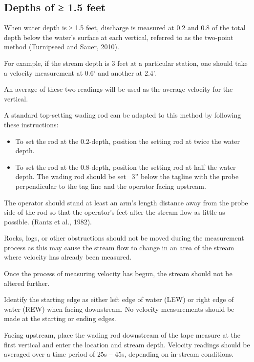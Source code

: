\documentclass[12pt]{../SOP3_beta}\usepackage[]{graphicx}\usepackage[]{xcolor}
\begin{document}
\subsection{Depths of ≥ 1.5 feet}

When water depth is ≥ 1.5 feet, discharge is measured at 0.2 and 0.8 of the total depth
below the water’s surface at each vertical, referred to as the two-point method
(Turnipseed and Sauer, 2010). 

\NP For example, if the stream depth is 3 feet at a particular
station, one should take a velocity measurement at 0.6’ and another at 2.4’. 

\NP An average
of these two readings will be used as the average velocity for the vertical.

\NP A standard top-setting wading rod can be adapted to this method by following these
instructions:

\begin{itemize}

\item To set the rod at the 0.2-depth, position the setting rod at twice the water
depth.

\item To set the rod at the 0.8-depth, position the setting rod at half the water depth.
The wading rod should be set ~3” below the tagline with the probe perpendicular to the
tag line and the operator facing upstream. 

\end{itemize}

\NP The operator should stand at least an arm’s
length distance away from the probe side of the rod so that the operator’s feet alter the
stream flow as little as possible. (Rantz et al., 1982). 

\NP Rocks, logs, or other obstructions
should not be moved during the measurement process as this may cause the stream
flow to change in an area of the stream where velocity has already been measured.

\NP Once the process of measuring velocity has begun, the stream should not be altered
further.

\NP Identify the starting edge as either left edge of water (LEW) or right edge of water (REW)
when facing downstream. No velocity measurements should be made at the starting or
ending edges. 

\NP Facing upstream, place the wading rod downstream of the tape measure
at the first vertical and enter the location and stream depth. Velocity readings should
be averaged over a time period of 25s – 45s, depending on in-stream conditions.
\end{document}
